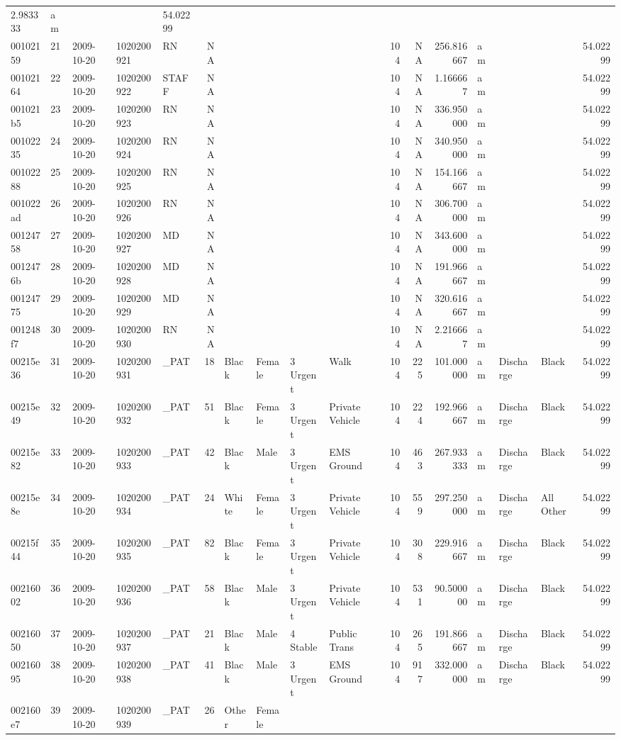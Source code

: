\documentclass[]{elsarticle} %
\begin{document}
\begin{longtable}[]{@{}lllllrllllrrrlllr@{}}
2.983333 & am & & & 54.02299\tabularnewline
00102159 & 21 & 2009-10-20 & 1020200921 & RN & NA & & & & & 104 & NA &
256.816667 & am & & & 54.02299\tabularnewline
00102164 & 22 & 2009-10-20 & 1020200922 & STAFF & NA & & & & & 104 & NA
& 1.166667 & am & & & 54.02299\tabularnewline
001021b5 & 23 & 2009-10-20 & 1020200923 & RN & NA & & & & & 104 & NA &
336.950000 & am & & & 54.02299\tabularnewline
00102235 & 24 & 2009-10-20 & 1020200924 & RN & NA & & & & & 104 & NA &
340.950000 & am & & & 54.02299\tabularnewline
00102288 & 25 & 2009-10-20 & 1020200925 & RN & NA & & & & & 104 & NA &
154.166667 & am & & & 54.02299\tabularnewline
001022ad & 26 & 2009-10-20 & 1020200926 & RN & NA & & & & & 104 & NA &
306.700000 & am & & & 54.02299\tabularnewline
00124758 & 27 & 2009-10-20 & 1020200927 & MD & NA & & & & & 104 & NA &
343.600000 & am & & & 54.02299\tabularnewline
0012476b & 28 & 2009-10-20 & 1020200928 & MD & NA & & & & & 104 & NA &
191.966667 & am & & & 54.02299\tabularnewline
00124775 & 29 & 2009-10-20 & 1020200929 & MD & NA & & & & & 104 & NA &
320.616667 & am & & & 54.02299\tabularnewline
001248f7 & 30 & 2009-10-20 & 1020200930 & RN & NA & & & & & 104 & NA &
2.216667 & am & & & 54.02299\tabularnewline
00215e36 & 31 & 2009-10-20 & 1020200931 & \_PAT & 18 & Black & Female &
3 Urgent & Walk & 104 & 225 & 101.000000 & am & Discharge & Black &
54.02299\tabularnewline
00215e49 & 32 & 2009-10-20 & 1020200932 & \_PAT & 51 & Black & Female &
3 Urgent & Private Vehicle & 104 & 224 & 192.966667 & am & Discharge &
Black & 54.02299\tabularnewline
00215e82 & 33 & 2009-10-20 & 1020200933 & \_PAT & 42 & Black & Male & 3
Urgent & EMS Ground & 104 & 463 & 267.933333 & am & Discharge & Black &
54.02299\tabularnewline
00215e8e & 34 & 2009-10-20 & 1020200934 & \_PAT & 24 & White & Female &
3 Urgent & Private Vehicle & 104 & 559 & 297.250000 & am & Discharge &
All Other & 54.02299\tabularnewline
00215f44 & 35 & 2009-10-20 & 1020200935 & \_PAT & 82 & Black & Female &
3 Urgent & Private Vehicle & 104 & 308 & 229.916667 & am & Discharge &
Black & 54.02299\tabularnewline
00216002 & 36 & 2009-10-20 & 1020200936 & \_PAT & 58 & Black & Male & 3
Urgent & Private Vehicle & 104 & 531 & 90.500000 & am & Discharge &
Black & 54.02299\tabularnewline
00216050 & 37 & 2009-10-20 & 1020200937 & \_PAT & 21 & Black & Male & 4
Stable & Public Trans & 104 & 265 & 191.866667 & am & Discharge & Black
& 54.02299\tabularnewline
00216095 & 38 & 2009-10-20 & 1020200938 & \_PAT & 41 & Black & Male & 3
Urgent & EMS Ground & 104 & 917 & 332.000000 & am & Discharge & Black &
54.02299\tabularnewline
002160e7 & 39 & 2009-10-20 & 1020200939 & \_PAT & 26 & Other & Female &

\end{longtable}
\end{document}
